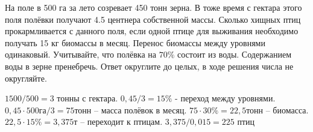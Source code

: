 
На поле в 500 га за лето созревает 450 тонн зерна. В тоже время с гектара этого поля полёвки получают 4.5 центнера 
собственной массы. Сколько хищных птиц прокармливается с данного поля, если одной птице для выживания необходимо получать 15 кг биомассы в месяц. Перенос биомассы между уровнями одинаковый. Учитывайте, что полёвка на $70\%$ состоит из воды. Содержанием воды в зерне пренебречь. Ответ округлите до целых, в ходе решения числа не округляйте.

\soultionSection

$1500/500 = 3$ тонны с гектара. $0,45/3 =15\%$ - переход между уровнями. \linebreak $0,45 \cdot 500 \text{га}/3=75$тонн – масса 
полёвок в месяц. $75 \cdot 30\%= 22,5$тонн – биомасса. $22,5 \cdot 15\% =3,375$т – переходит к птицам. 
$3,375/0,015=225$ птиц

